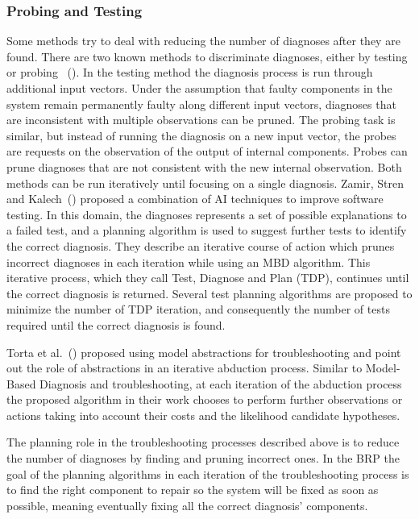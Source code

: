 \documentclass[review]{elsarticle}
\begin{document}
\subsubsection{Probing and Testing}
Some methods try to deal with reducing the number of diagnoses after they are found. There are two known methods to discriminate diagnoses, either by testing or probing ~(\cite{de1987diagnosing}). In the testing method the diagnosis process is run through additional input vectors. Under the assumption that faulty components in the system remain permanently faulty along different input vectors, diagnoses that are inconsistent with multiple observations can be pruned. The probing task is similar, but instead of running the diagnosis on a new input vector, the probes are requests on the observation of the output of internal components. Probes can prune diagnoses that are not consistent with the new internal observation. Both methods can be run iteratively until focusing on a single diagnosis.
Zamir, Stren and Kalech~(\cite{zamir2014using}) proposed a combination of AI techniques to improve software testing. In this domain, the diagnoses represents a set of possible explanations to a failed test, and a planning algorithm is used to suggest further tests to identify the correct diagnosis. They describe an iterative course of action which prunes incorrect diagnoses in each iteration while using an MBD algorithm. This iterative process, which they call Test, Diagnose and Plan (TDP), continues until the correct diagnosis is returned. Several test planning algorithms are proposed to minimize the number of TDP iteration, and consequently the number of tests required until the correct diagnosis is found. 


Torta et al.~(\cite{Torta14}) proposed using model abstractions for troubleshooting and point out the role of abstractions in an iterative abduction process. Similar to Model-Based Diagnosis and troubleshooting, at each iteration of the abduction process the proposed algorithm in their work chooses to perform further observations or actions taking into account their costs and the likelihood candidate hypotheses.

The planning role in the troubleshooting processes described above is to reduce the number of diagnoses by finding and pruning incorrect ones. In the BRP the goal of the planning algorithms in each iteration of the troubleshooting process is to find the right component to repair so the system will be fixed as soon as possible, meaning eventually fixing all the correct diagnosis' components. 
\end{document}
